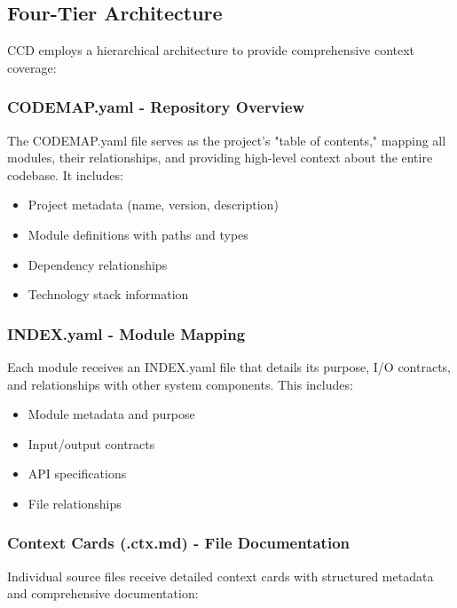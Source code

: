 \documentclass[11pt,a4paper]{article}
\begin{document}
\subsection{Four-Tier Architecture}

CCD employs a hierarchical architecture to provide comprehensive context coverage:

\subsubsection{CODEMAP.yaml - Repository Overview}

The CODEMAP.yaml file serves as the project's "table of contents," mapping all modules, their relationships, and providing high-level context about the entire codebase. It includes:

\begin{itemize}
    \item Project metadata (name, version, description)
    \item Module definitions with paths and types
    \item Dependency relationships
    \item Technology stack information
\end{itemize}

\subsubsection{INDEX.yaml - Module Mapping}

Each module receives an INDEX.yaml file that details its purpose, I/O contracts, and relationships with other system components. This includes:

\begin{itemize}
    \item Module metadata and purpose
    \item Input/output contracts
    \item API specifications
    \item File relationships
\end{itemize}

\subsubsection{Context Cards (.ctx.md) - File Documentation}

Individual source files receive detailed context cards with structured metadata and comprehensive documentation:
\end{document}
